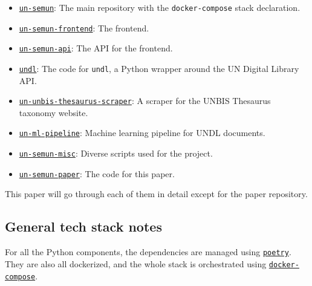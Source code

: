 \begin{itemize}
    \item \href{https://github.com/ClementSicard/un-semun}{\faGithub{} \texttt{un-semun}}: The main repository with the \texttt{docker-compose} stack declaration.
    \item \href{https://github.com/ClementSicard/un-semun-frontend}{\faGithub{} \texttt{un-semun-frontend}}: The frontend.
    \item \href{https://github.com/ClementSicard/un-semun-api}{\faGithub{} \texttt{un-semun-api}}: The API for the frontend.
    \item \href{https://github.com/ClementSicard/undl}{\faGithub{} \texttt{undl}}: The code for \texttt{undl}, a Python wrapper around the UN Digital Library API.
    \item \href{https://github.com/ClementSicard/un-unbis-thesaurus-scraper}{\faGithub{} \texttt{un-unbis-thesaurus-scraper}}: A scraper for the UNBIS Thesaurus taxonomy website.
    \item \href{https://github.com/ClementSicard/un-ml-pipeline}{\faGithub{} \texttt{un-ml-pipeline}}: Machine learning pipeline for UNDL documents.
    \item \href{https://github.com/ClementSicard/un-semun-misc}{\faGithub{} \texttt{un-semun-misc}}: Diverse scripts used for the project.
    \item \href{https://github.com/ClementSicard/un-semun-paper}{\faGithub{} \texttt{un-semun-paper}}: The code for this paper.
\end{itemize}

This paper will go through each of them in detail except for the paper repository.





















\subsection{General tech stack notes} \label{ssec:general-tech-stack-notes}

For all the Python components, the dependencies are managed using \href{https://github.com/python-poetry/poetry}{\texttt{poetry}}. They are also all dockerized, and the whole stack is orchestrated using \href{https://docs.docker.com/compose/}{\texttt{docker-compose}}.
